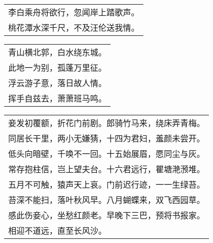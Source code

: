 \nopagebreak%
\nopagebreak%
\noindent\begin{minipage}{\linewidth}
  \vskip-3pt\begin{table}[H]
    \centering
    \begin{tabular}{@{}l@{}}
李白乘舟将欲行，忽闻岸上踏歌声。\\
桃花潭水深千尺，不及汪伦送我情。
    \end{tabular}
  \end{table}
\end{minipage}
\vspace{1cm}


\nopagebreak%
\nopagebreak%
\noindent\begin{minipage}{\linewidth}
  \vskip-3pt\begin{table}[H]
    \centering
    \begin{tabular}{@{}l@{}}
青山横北郭，白水绕东城。\\
此地一为别，孤蓬万里征。\\
浮云游子意，落日故人情。\\
挥手自兹去，萧萧班马鸣。
    \end{tabular}
  \end{table}
\end{minipage}
\vspace{1cm}


\nopagebreak%
\nopagebreak%
\noindent\begin{minipage}{\linewidth}
  \vskip-3pt\begin{table}[H]
    \centering
    \begin{tabular}{@{}l@{}}
妾发初覆额，折花门前剧。郎骑竹马来，绕床弄青梅。\\
同居长干里，两小无嫌猜，十四为君妇，羞颜未尝开。\\
低头向暗壁，千唤不一回。十五始展眉，愿同尘与灰。\\
常存抱柱信，岂上望夫台。十六君远行，瞿塘滟滪堆。\\
五月不可触，猿声天上哀。门前迟行迹，一一生绿苔。\\
苔深不能扫，落叶秋风早。八月蝴蝶来，双飞西园草。\\
感此伤妾心，坐愁红颜老。早晚下三巴，预将书报家。\\
相迎不道远，直至长风沙。
    \end{tabular}
  \end{table}
\end{minipage}
\vspace{1cm}


